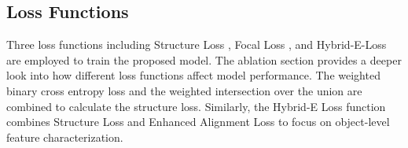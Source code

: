 \documentclass[review]{elsarticle}
\begin{document}
\subsection{Loss Functions}
Three loss functions including Structure Loss \cite{fan2020pranet}, Focal Loss \cite{lin2017focal}, and Hybrid-E-Loss \cite{fan2021cognitive} are employed to train the proposed model. The ablation section provides a deeper look into how different loss functions affect model performance. The weighted binary cross entropy loss and the weighted intersection over the union are combined to calculate the structure loss. Similarly, the Hybrid-E Loss function combines Structure Loss and Enhanced Alignment Loss to focus on object-level feature characterization.

%
\end{document}
